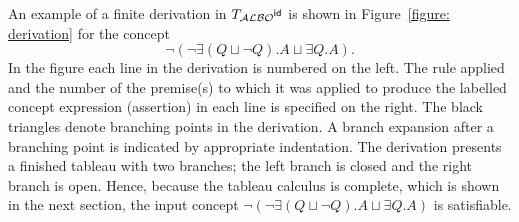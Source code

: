 \documentclass[leqno
,pdflatex
,prodmode
,acmtocl
]{acmsmall}
\newcommand{\mathcmd}[1]{\ensuremath{#1}\xspace}
\newcommand{\dlfont}{\mathcal}
\newcommand{\dl}[1]{\mathcmd{\dlfont{#1}}}
\newcommand{\idRole}{\mathcmd{\textsf{\upshape\mdseries id}}}
\newcommand{\ALBOid}{\dl{ALBO\smash[t]{\mbox{${}^{\idRole}$}}}}
\def\Not{\neg}
\def\Or{\sqcup}
\newcommand{\cname}{A}
\newcommand{\rname}{Q}
\begin{document}
An example of a finite derivation in $T_\ALBOid$ is shown in Figure~\ref{figure: derivation} for the concept
\[\Not\left(\Not\exists(\rname\Or\Not \rname).\cname\Or\exists \rname.\cname\right).\]
In the figure each line in the derivation is numbered on the left.
The rule applied and the number of the premise(s) to which it was
applied to produce the labelled concept expression (assertion) in each
line is specified on the right.
The black triangles denote branching points in the derivation.
A branch expansion after a branching point is indicated
by appropriate indentation.
The derivation presents a finished tableau with two branches; the
left branch is closed and the right branch is open.
Hence, because the tableau calculus is complete, which is shown in
the next section, the input concept $\Not\left(\Not\exists(\rname\Or\Not \rname).\cname\Or\exists
\rname.\cname\right)$ is satisfiable.
\end{document}
